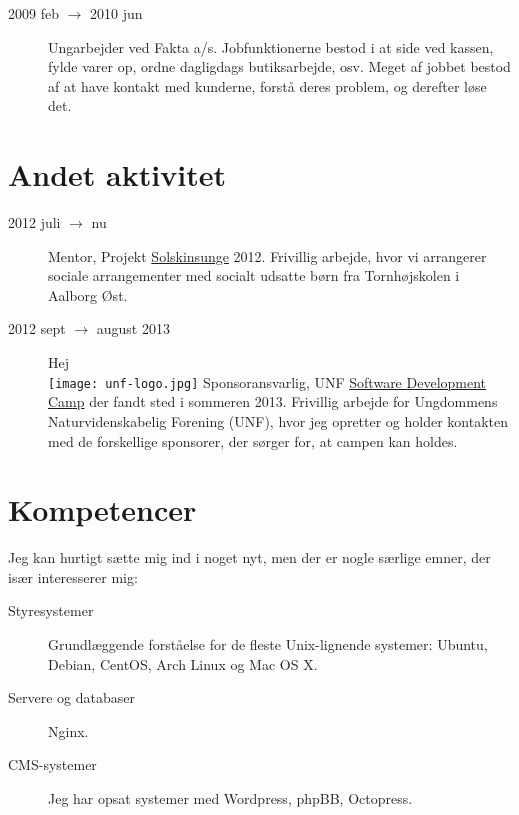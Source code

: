 \documentclass[margin,line,a4paper]{resume}
\begin{document}
\begin{resume}
\begin{description}
  \item[2009 feb $\rightarrow$ 2010 jun] Ungarbejder ved Fakta
    a/s. Jobfunktionerne bestod i at side ved kassen, fylde varer op,
    ordne dagligdags butiksarbejde, osv. Meget af jobbet bestod af at have
    kontakt med kunderne, forstå deres problem, og derefter løse det.
\end{description}

\section{\mysidestyle Andet aktivitet}\vspace{1mm}
\begin{description}
  \item[2012 juli $\rightarrow$ nu] Mentor, Projekt
    \href{http://www.urk.dk/solskinsunge/}{Solskinsunge} 2012. Frivillig
    arbejde, hvor vi arrangerer sociale arrangementer med socialt udsatte
    børn fra Tornhøjskolen i Aalborg Øst.

  \item[2012 sept $\rightarrow$ august 2013] Hej \\ 
    \texttt{[image: unf-logo.jpg]}
    Sponsoransvarlig, UNF
    \href{http://software.unf.dk}{Software Development Camp} der
    fandt sted i sommeren 2013. Frivillig arbejde for Ungdommens
    Naturvidenskabelig Forening (UNF), hvor jeg opretter og holder
    kontakten med de forskellige sponsorer, der sørger for, at campen kan
    holdes.
\end{description}

\section{\mysidestyle Kompetencer} \vspace{1mm}
Jeg kan hurtigt sætte mig
ind i noget nyt, men der er nogle særlige emner, der især interesserer
mig:
\vspace{0.5cm}
\begin{description}

  \item[Styresystemer] Grundlæggende forståelse for de fleste
    Unix-lignende systemer: Ubuntu, Debian, CentOS, Arch Linux og Mac OS
    X.

  \item[Servere og databaser] Nginx. 

  \item[CMS-systemer] Jeg har opsat systemer med Wordpress, phpBB,
    Octopress.


\end{description}
\end{resume}
\end{document}
